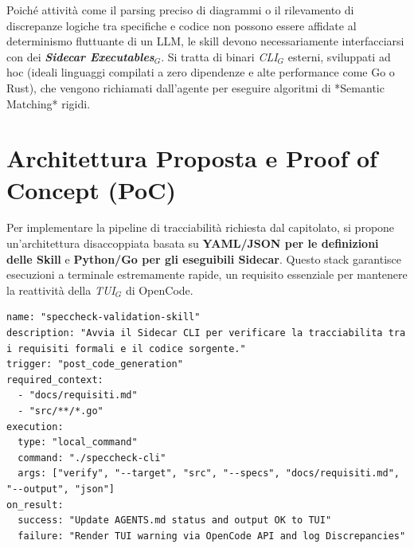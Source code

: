 \documentclass[a4paper, 11pt]{article}
\newcommand{\term}[1]{\textit{#1}$_G$}
\begin{document}
    Poiché attività come il parsing preciso di diagrammi o il rilevamento di discrepanze logiche tra specifiche e codice non possono essere affidate al determinismo fluttuante di un LLM, le skill devono necessariamente interfacciarsi con dei \textbf{\term{Sidecar Executables}}. Si tratta di binari \term{CLI} esterni, sviluppati ad hoc (ideali linguaggi compilati a zero dipendenze e alte performance come Go o Rust), che vengono richiamati dall'agente per eseguire algoritmi di *Semantic Matching* rigidi.

\section{Architettura Proposta e Proof of Concept (PoC)}

Per implementare la pipeline di tracciabilità richiesta dal capitolato, si propone un'architettura disaccoppiata basata su \textbf{YAML/JSON per le definizioni delle Skill} e \textbf{Python/Go per gli eseguibili Sidecar}. Questo stack garantisce esecuzioni a terminale estremamente rapide, un requisito essenziale per mantenere la reattività della \term{TUI} di OpenCode.

\begin{lstlisting}[style=yamlstyle, caption={Definizione concettuale di una Skill OpenCode per la validazione della tracciabilità (\texttt{speccheck-validation-skill.yaml}).}]
name: "speccheck-validation-skill"
description: "Avvia il Sidecar CLI per verificare la tracciabilita tra i requisiti formali e il codice sorgente."
trigger: "post_code_generation"
required_context:
  - "docs/requisiti.md"
  - "src/**/*.go"
execution:
  type: "local_command"
  command: "./speccheck-cli"
  args: ["verify", "--target", "src", "--specs", "docs/requisiti.md", "--output", "json"]
on_result:
  success: "Update AGENTS.md status and output OK to TUI"
  failure: "Render TUI warning via OpenCode API and log Discrepancies"
\end{lstlisting}
\end{document}
